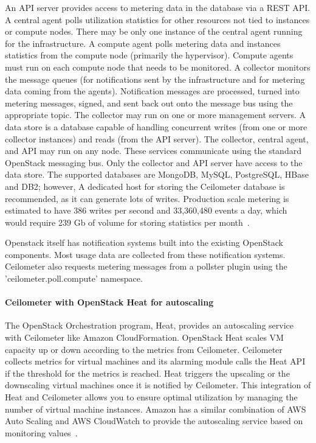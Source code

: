 \documentclass{sig-alternate-05-2015}
\begin{document}
An API server provides access to metering data in the database via a REST API. A central agent polls utilization statistics for other resources not tied to instances or compute nodes. There may be only one instance of the central agent running for the infrastructure. A compute agent polls metering data and instances statistics from the compute node (primarily the hypervisor). Compute agents must run on each compute node that needs to be monitored. A collector monitors the message queues (for notifications sent by the infrastructure and for metering data coming from the agents). Notification messages are processed, turned into metering messages, signed, and sent back out onto the message bus using the appropriate topic. The collector may run on one or more management servers. A data store is a database capable of handling concurrent writes (from one or more collector instances) and reads (from the API server). The collector, central agent, and API may run on any node. These services communicate using the standard OpenStack messaging bus. Only the collector and API server have access to the data store. The supported databases are MongoDB, MySQL, PostgreSQL, HBase and DB2; however, A dedicated host for storing the Ceilometer database is recommended, as it can generate lots of writes. Production scale metering is estimated to have 386 writes per second and 33,360,480 events a day, which would require 239 Gb of volume for storing statistics per month~\cite{Barcet12}.

Openstack itself has notification systems built into the existing OpenStack components. Most usage data are collected from these notification systems. Ceilometer also requests metering messages from a pollster plugin using the 'ceilometer.poll.compute' namespace.

\paragraph{Ceilometer with OpenStack Heat for autoscaling}

The OpenStack Orchestration program, Heat, provides an autoscaling service with Ceilometer like Amazon CloudFormation. OpenStack Heat scales VM capacity up or down according to the metrics from Ceilometer. Ceilometer collects metrics for virtual machines and its alarming module calls the Heat API if the threshold for the metrics is reached. Heat triggers the upscaling or the downscaling virtual machines once it is notified by Ceilometer. This integration of Heat and Ceilometer allows you to ensure optimal utilization by managing the number of virtual machine instances. Amazon has a similar combination of AWS Auto Scaling and AWS CloudWatch to provide the autoscaling service based on monitoring values~\cite{Abaakouk13}.
\end{document}
